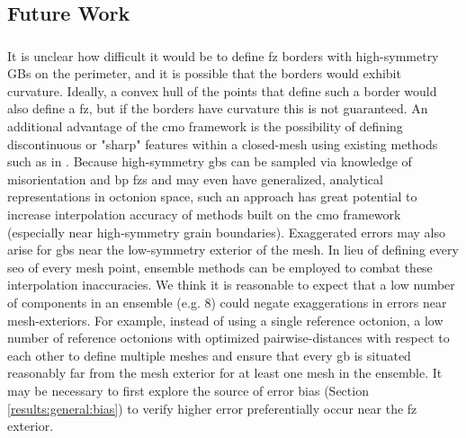 \documentclass[preprint,12pt]{elsarticle}
\begin{document}
\subsection{Future Work} \label{sec:conclusions:future}

\subsubsection{}
It is unclear how difficult it would be to define \gls{fz} borders with high-symmetry GBs on the perimeter, and it is possible that the borders would exhibit curvature. Ideally, a convex hull of the points that define such a border would also define a \gls{fz}, but if the borders have curvature this is not guaranteed. An additional advantage of the \gls{cmo} framework is the possibility of defining discontinuous or "sharp" features within a closed-mesh using existing methods such as in \cite{tianNonUniformSubdivisionSurfaces2020}. Because high-symmetry \glspl{gb} can be sampled via knowledge of misorientation and \gls{bp} \glspl{fz} and may even have generalized, analytical representations in octonion space, such an approach has great potential to increase interpolation accuracy of methods built on the \gls{cmo} framework (especially near high-symmetry grain boundaries). Exaggerated errors may also arise for \glspl{gb} near the low-symmetry exterior of the mesh. In lieu of defining every \gls{seo} of every mesh point, ensemble methods can be employed to combat these interpolation inaccuracies. We think it is reasonable to expect that a low number of components in an ensemble (e.g. 8) could negate exaggerations in errors near mesh-exteriors. For example, instead of using a single reference octonion, a low number of reference octonions with optimized pairwise-distances \cite{dolanBenchmarkingOptimizationSoftware2004,ConstrainedElectrostaticNonlinear2020} with respect to each other to define multiple meshes and ensure that every \gls{gb} is situated reasonably far from the mesh exterior for at least one mesh in the ensemble. It may be necessary to first explore the source of error bias (Section \ref{results:general:bias}) to verify higher error preferentially occur near the \gls{fz} exterior.
\end{document}
